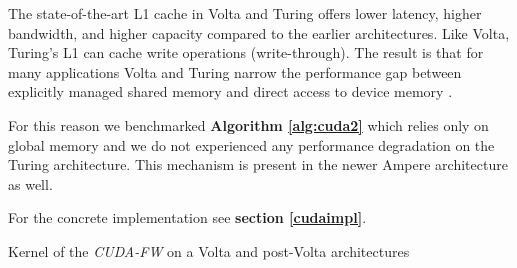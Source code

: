 The state-of-the-art L1 cache in Volta and Turing offers lower latency, higher bandwidth, and higher capacity compared to the earlier architectures. Like Volta, Turing's L1 can cache write operations (write-through). The result is that for many applications Volta and Turing narrow the performance gap between explicitly managed shared memory and direct access to device memory \cite{nvidia}. \par
For this reason we benchmarked \textbf{Algorithm \ref*{alg:cuda2}} which relies only on global memory and we do not experienced any performance degradation on the Turing architecture.
This mechanism is present in the newer Ampere architecture as well.

For the concrete implementation see \textbf{section \ref{cudaimpl}}.



\begin{algorithm}[h!]

\SetAlgoLined

\DontPrintSemicolon
 
\caption{Kernel of the \emph{CUDA-FW} on a Volta and post-Volta architectures}\label{alg:cuda2}
\end{algorithm}

